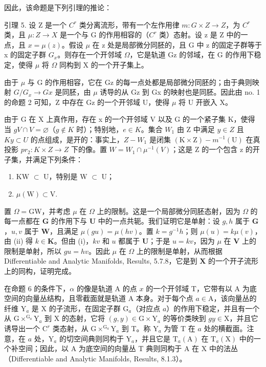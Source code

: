 因此，该命题是下列引理的推论：

引理 5. 设 Z 是一个 \(C^{r}\) 类分离流形，带有一个左作用律 \(m: G \times Z \to Z\)，为 \(C^{r}\) 类，且 \(\mu: Z \to X\) 是一个与 G 的作用相容的（\(C^{r}\) 类）态射。设 z 是 Z 中的一点，且 \(x = \mu(z)\)。假设 \(\mu\) 在 z 处是局部微分同胚的，且 G 中 z 的固定子群等于 x 的固定子群 \(G_{x}\)。则存在一个开邻域 \(\Omega\)，它是轨道 Gz 的邻域，在 G 的作用下稳定，使得 \(\mu\) 将 \(\Omega\) 同构到 X 的一个开子集上。

由于 \(\mu\) 与 G 的作用相容，它在 Gz 的每一点处都是局部微分同胚的；由于典则映射 \(G/G_{x} \rightarrow Gx\) 是同胚，由 \(\mu\) 诱导的从 Gz 到 Gx 的映射也是同胚。因此由 no. 1 的命题 2 可知，Z 中存在 Gz 的一个开邻域 U，使得 \(\mu\) 将 U 开嵌入 X。

由于 G 在 X 上真作用，存在 x 的一个开邻域 V 以及 G 的一个紧子集 K，使得当 \(gV \cap V = \varnothing\)（\(g \notin K\) 时）；特别地，\(e \in K\)。集合 \(W_{1}\) 由 Z 中满足 \(y \in Z\) 且 \(Ky \subset U\) 的点组成，是开的：事实上，\(Z - W_{1}\) 是闭集 \((\mathrm{K} \times \mathrm{Z}) - m^{-1}(\mathrm{U})\) 在真投影 \(pr_{2}: K \times Z \to Z\) 下的像。置 \(W = W_{1} \cap \mu^{-1}(V)\)；这是 Z 的一个包含 z 的开子集，并满足下列条件：

\begin{enumerate}
\def\labelenumi{(\roman{enumi})}
\item
  KW \(\subset\) U，特别是 W \(\subset\) U；
\item
  \(\mu(\mathrm{W}) \subset \mathrm{V}.\)
\end{enumerate}

置 \(\Omega = \mathrm{GW}\)，并考虑 \(\mu\) 在 \(\Omega\) 上的限制。这是一个局部微分同胚态射，因为 \(\Omega\) 的每一点都在 \(\mathbf{G}\) 的作用下与 \(\mathbf{U}\) 中的一点共轭。我们证明它是单射：设 \(g, h\) 属于 \(\mathbf{G}\)，\(u, v\) 属于 \(\mathbf{W}\)，且满足 \(\mu(gu) = \mu(hv)\)。置 \(k = g^{-1}h\)；则 \(\mu(u) = k\mu(v)\)，由 (ii) 得 \(k \in \mathbf{K}\)。但由 (i)，\(kv\) 和 \(u\) 都属于 \(\mathbf{U}\)；于是 \(u = kv\)，因为 \(\mu\) 在 \(\mathbf{V}\) 上的限制是单射，所以 \(gu = hv\)。因此 \(\mu\) 在 \(\Omega\) 上的限制是单射，从而根据 Differentiable and Analytic Manifolds, Results, 5.7.8，它是到 \(\mathbf{X}\) 的一个开子流形上的同构，证明完成。

在命题 6 的条件下，\(\alpha\) 的像是轨道 A 的点 \(x\) 的一个开邻域 T，它带有以 A 为底空间的向量丛结构，且零截面就是轨道 A 本身。对于每个点 \(a \in \mathrm{A}\)，该向量丛的纤维 \(\mathrm{Y}_a\) 是 X 的子流形，在固定子群 \(\mathrm{G}_a\)（对应点 \(a\)）的作用下稳定，并且有一个从 \(\mathrm{G} \times^{\mathrm{G}_a}\mathrm{Y}_a\) 到 X 的态射，它将 \((g,y) \in \mathrm{G} \times \mathrm{Y}_a\) 的等价类映到 \(gy \in \mathrm{X}\)，并且它诱导出一个 \(\mathrm{C}^r\) 类态射，从 \(\mathrm{G} \times^{\mathrm{G}_a}\mathrm{Y}_a\) 到 T。称 \(\mathrm{Y}_a\) 为管 T 在 \(a\) 处的横截面。注意，在 \(a\) 处，\(\mathrm{Y}_a\) 的切空间典则同构于 \(\mathrm{Y}_a\)，并且它是 \(\mathrm{T}_a(\mathrm{A})\) 在 \(\mathrm{T}_a(\mathrm{X})\) 中的一个补空间；因此，以 A 为底空间的向量丛 T 典则同构于 A 在 X 中的法丛（Differentiable and Analytic Manifolds, Results, 8.1.3）。

